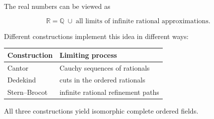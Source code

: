 \begin{remark*}

The real numbers can be viewed as

\[
\boxed{
\mathbb{R}
=
\mathbb{Q}
\;\cup\;
\text{all limits of infinite rational approximations}.
}
\]

Different constructions implement this idea in different ways:

\begin{center}
\begin{tabular}{l l}
\toprule
Construction & Limiting process \\
\midrule
Cantor & Cauchy sequences of rationals \\
Dedekind & cuts in the ordered rationals \\
Stern--Brocot & infinite rational refinement paths \\
\bottomrule
\end{tabular}
\end{center}

All three constructions yield isomorphic complete ordered fields.

\end{remark*}
